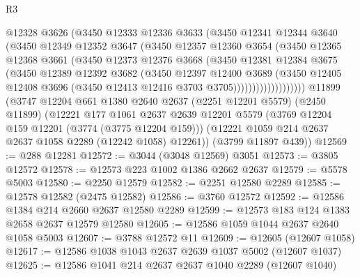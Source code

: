 \begin{lexlean}{R3}
\begin{coremodule}
                    @12328
                    @3626
                    (@3450
                      @12333
                      @12336
                      @3633
                      (@3450
                        @12341
                        @12344
                        @3640
                        (@3450
                          @12349
                          @12352
                          @3647
                          (@3450
                            @12357
                            @12360
                            @3654
                            (@3450
                              @12365
                              @12368
                              @3661
                              (@3450
                                @12373
                                @12376
                                @3668
                                (@3450
                                  @12381
                                  @12384
                                  @3675
                                  (@3450
                                    @12389
                                    @12392
                                    @3682
                                    (@3450
                                      @12397
                                      @12400
                                      @3689
                                      (@3450
                                        @12405
                                        @12408
                                        @3696
                                        (@3450 @12413 @12416 @3703 @3705)))))))))))))))))))
    @11899
    (@3747
      @12204
      @661
      @1380
      @2640
      @2637
      (@2251 @12201 @5579)
      (@2450 @11899)
      (@12221
        @177
        @1061
        @2637
        @2639
        @12201
        @5579
        (@3769 @12204 @159 @12201 (@3774 (@3775 @12204 @159)))
        (@12221 @1059 @214 @2637 @2637 @1058 @2289 (@12242 @1058) @12261))
      (@3799 @11897 @439))
@12569 := @288 @12281
@12572 := @3044 (@3048 @12569) @3051
@12573 := @3805 @12572
@12578 := @12573 @223 @1002 @1386 @2662 @2637
@12579 := @5578 @5003
@12580 := @2250 @12579
@12582 := @2251 @12580 @2289
@12585 := @12578 @12582 (@2475 @12582)
@12586 := @3760 @12572
@12592 := @12586 @1384 @214 @2660 @2637 @12580 @2289
@12599 := @12573 @183 @124 @1383 @2658 @2637 @12579 @12580
@12605 := @12586 @1059 @1044 @2637 @2640 @1058 @5003
@12607 := @3788 @12572 @11
@12609 := @12605 (@12607 @1058)
@12617 := @12586 @1038 @1043 @2637 @2639 @1037 @5002 (@12607 @1037)
@12625 := @12586 @1041 @214 @2637 @2637 @1040 @2289 (@12607 @1040)

\end{coremodule}
\end{lexlean}
